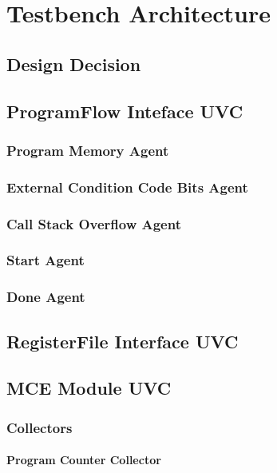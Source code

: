 \section{Testbench Architecture}

\subsection{Design Decision}

\subsection{ProgramFlow Inteface UVC}

\subsubsection{Program Memory Agent}

\subsubsection{External Condition Code Bits Agent}

\subsubsection{Call Stack Overflow Agent}

\subsubsection{Start Agent}

\subsubsection{Done Agent}

\subsection{RegisterFile Interface UVC}

\subsection{MCE Module UVC}

\subsubsection{Collectors}

\paragraph{Program Counter Collector}

